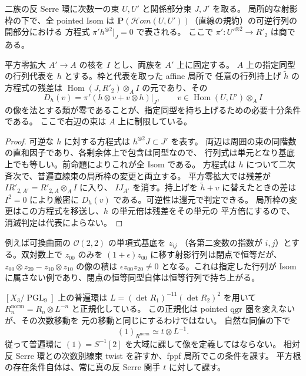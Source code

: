 \begin{corollary}[関係部分束による指定同型の無限小判定]
\label{cor:relative-pointed-isom-obstruction}
二族の反 Serre 環に次数一の束 $U,U'$ と関係部分束 $J,J'$ を取る。
局所的な射影枠の下で、全 pointed Isom は
$\mathbf P(\mathcal Hom(U,U'))$（直線の規約）の可逆行列の開部分における
方程式 $\pi'h^{\otimes2}|_J=0$ で表される。
ここで $\pi':U'^{\otimes2}\to R'_2$ は商である。

平方零拡大 $A'\to A$ の核を $I$ とし、両族を $A'$ 上に固定する。
$A$ 上の指定同型の行列代表を $h$ とする。枠と代表を取った affine 局所で
任意の行列持上げ $\widetilde h$ の方程式の残差は
$\operatorname{Hom}(J,R'_2)\otimes_A I$ の元であり、その
\[
 D_h(v)=\pi'(h\otimes v+v\otimes h)|_J,\qquad
 v\in\operatorname{Hom}(U,U')\otimes_A I
\]
の像を法とする類が零であることが、指定同型を持ち上げるための必要十分条件である。
ここで右辺の束は $A$ 上に制限している。
\end{corollary}
\begin{proof}
可逆な $h$ に対する方程式は $h^{\otimes2}J\subset J'$ を表す。
両辺は周囲の束の同階数の直和因子であり、各剰余体上で包含は同型なので、
行列式は単元となり基底上でも等しい。前命題によりこれが全 Isom である。
方程式は $h$ について二次斉次で、普遍直線束の局所枠の変更と両立する。
平方零拡大では残差が $I R'_{2,A'}=R'_{2,A}\otimes_A I$ に入り、
$I J_{A'}$ を消す。持上げを $\widetilde h+v$ に替えたときの差は
$I^2=0$ により厳密に $D_h(v)$ である。可逆性は還元で判定できる。
局所枠の変更はこの方程式を移送し、$h$ の単元倍は残差をその単元の
平方倍にするので、消滅判定は代表によらない。
\end{proof}

例えば可換曲面の $\mathcal O(2,2)$ の単項式基底を $z_{ij}$
（各第二変数の指数が $i,j$）とする。双対数上で $z_{00}$ のみを
$(1+\epsilon)z_{00}$ に移す射影行列は閉点で恒等だが、
$z_{00}\otimes z_{20}-z_{10}\otimes z_{10}$ の像の積は
$\epsilon z_{00}z_{20}\ne0$ となる。これは指定した行列が
Isom に属さない例であり、閉点の恒等同型自体は恒等行列で持ち上がる。

\begin{remark}[普遍環の次数別線束と認識条件]
\label{rem:relative-h2-line-twist}
$[X_3/\operatorname{PGL}_9]$ 上の普遍環は
$L=(\det R_1)^{-11}(\det R_2)^2$ を用いて
$R_n^{\mathrm{norm}}=R_n\otimes L^{-n}$ と正規化している。
この正規化は pointed $\operatorname{qgr}$ 圏を変えないが、その次数移動を
元の移動と同じにするわけではない。
自然な同値の下で
\[
 (1)_{R^{\mathrm{norm}}}\simeq t\otimes L^{-1}.
\]
従って普遍環に $(1)=S^{-1}[2]$ を大域に課して像を定義してはならない。
相対反 Serre 環との次数別線束 twist を許すか、fppf 局所でこの条件を課す。
平方根の存在条件自体は、常に真の反 Serre 関手 $t$ に対して課す。
\end{remark}

